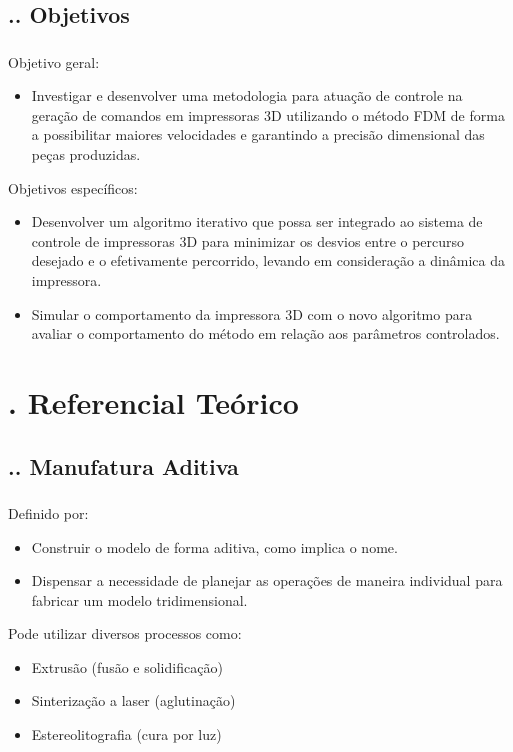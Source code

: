 \documentclass[aspectratio=169]{beamer}
\begin{document}
\subsection{\insertsectionnumber .\insertsubsectionnumber . Objetivos}
\begin{frame}
  \frametitle{\insertsubsection}
  Objetivo geral:
  \begin{itemize}
    \item Investigar e desenvolver uma metodologia para atuação de controle na geração de
    comandos em impressoras 3D utilizando o método FDM de forma a possibilitar maiores velocidades e garantindo a precisão dimensional das peças produzidas.
  \end{itemize}
  Objetivos específicos:
  \begin{itemize}
    \item Desenvolver um algoritmo iterativo que possa ser integrado ao sistema de controle de impressoras 3D para minimizar os desvios entre o percurso desejado e o efetivamente percorrido, levando em consideração a dinâmica da impressora.
    \item Simular o comportamento da impressora 3D com o novo algoritmo para avaliar o comportamento do método em relação aos parâmetros controlados.
  \end{itemize}

\end{frame}

\section{\insertsectionnumber . Referencial Teórico}

\subsection{\insertsectionnumber .\insertsubsectionnumber . Manufatura Aditiva}
\begin{frame}
  \frametitle{\insertsubsection}
  Definido por:
  \begin{itemize}
    \item Construir o modelo de forma aditiva, como implica o nome.
    \item Dispensar a necessidade de planejar as operações de maneira individual para fabricar um modelo tridimensional.
  \end{itemize}
  Pode utilizar diversos processos como:
  \begin{itemize}
    \item Extrusão (fusão e solidificação)
    \item Sinterização a laser (aglutinação)
    \item Estereolitografia (cura por luz)
  \end{itemize}
\end{frame}
\end{document}
